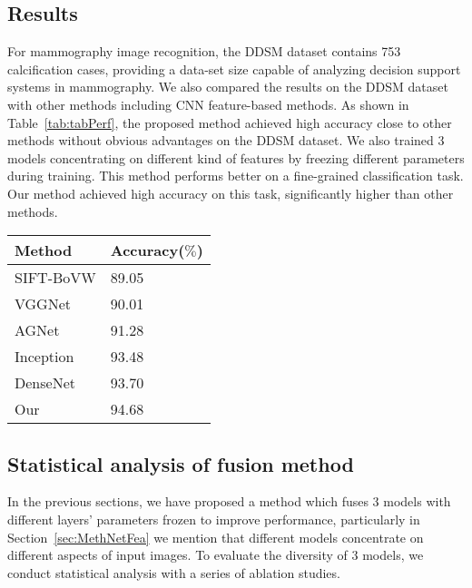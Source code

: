 \subsection{Results}
\label{sec:ExpRes}

For mammography image recognition, the DDSM 
dataset contains 753 calcification cases, 
providing a data-set size capable of 
analyzing decision support systems in 
mammography. We also compared the results 
on the DDSM dataset with other methods 
including CNN feature-based methods. 
As shown in 
Table~\ref{tab:tabPerf},
the proposed method achieved high accuracy 
close to other methods without obvious 
advantages on the DDSM dataset. We also trained 
3 models concentrating on different kind
of features by freezing different 
parameters during training. This method 
performs better on a fine-grained 
classification task. Our method achieved 
high accuracy on this task, significantly 
higher than other methods.

\begin{table*}[!ht]
    \caption{Performance comparing to 
        different methods}
    \label{tab:tabPerf}
    \setlength{\arrayrulewidth}{1.05 pt}
    \renewcommand{\arraystretch}{1.1}
    \begin{tabular*}{1.0\textwidth}{
        @{
            \extracolsep{\fill}
        }ll
    }
        \hline
        Method & Accuracy($\%$) \\
        \hline
        SIFT-BoVW       & 89.05 \\
        VGGNet          & 90.01 \\
        AGNet           & 91.28 \\
        Inception       & 93.48 \\
        DenseNet        & 93.70 \\
        Our             & 94.68 \\
        \hline
    \end{tabular*}
\end{table*}

\subsection{Statistical analysis of fusion method}
\label{ExpSA}

In the previous sections, we have proposed 
a method which fuses 3 models with different 
layers’ parameters frozen to improve 
performance, particularly in 
Section~\ref{sec:MethNetFea} 
we mention that different models 
concentrate on different aspects of input 
images. To evaluate the diversity of 3 
models, we conduct statistical analysis with 
a series of ablation studies.

